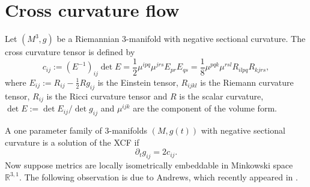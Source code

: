 \section{Cross curvature flow}\label{cross}
Let $(M^3,g)$ be a Riemannian 3-manifold with negative sectional curvature. The cross curvature tensor is defined by
\[c_{ij}:=(E^{-1})_{ij}\det E=\frac{1}{2}\mu^{ipq}\mu^{jrs}E_{pr}E_{qs}=\frac{1}{8}\mu^{pqk}\mu^{rsl}R_{ilpq}R_{kjrs},\]
where $E_{ij}:=R_{ij}-\frac{1}{2}Rg_{ij}$ is the Einstein tensor, $R_{ijkl}$ is the Riemann curvature tensor, $R_{ij}$ is the Ricci curvature tensor and $R$ is the scalar curvature, $\det E:=\det E_{ij}/\det g_{ij}$ and $\mu^{ijk}$ are the component of the volume form.

A one parameter family of 3-manifolds $(M,g(t))$ with negative sectional curvature is a solution of the XCF if
\[\partial_tg_{ij}=2c_{ij}.\]
Now suppose metrics are locally isometrically embeddable in Minkowski space $\mathbb{R}^{3,1}$. The following observation is due to Andrews, which recently appeared in \cite{AndrewsChenFangMcCoy:/2015}.

